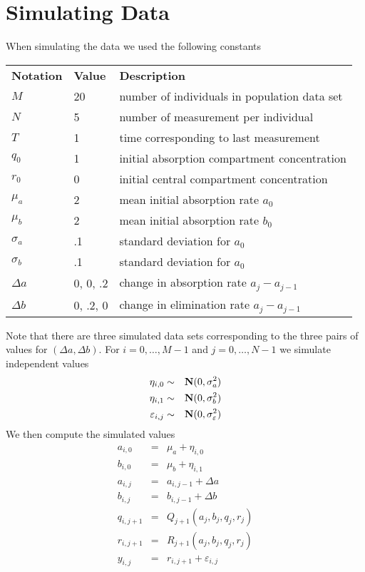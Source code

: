 \documentclass{article}
\newcommand{\B}[1]{{\bf #1}}
\begin{document}
\section{Simulating Data}
When simulating the data we used the following constants

\bigskip
\begin{tabular}{lll}
{\bf Notation}    & {\bf Value} & {\bf Description} \\
\( M \)           &  20     & number of individuals in population data set \\
\( N \)           &  5      & number of measurement per individual \\
\( T \)           &  1      & time corresponding to last measurement \\
\( q_0 \)         &  1      & initial absorption compartment concentration \\
\( r_0 \)         &  0      & initial central compartment concentration  \\
\( \mu_a \)       &  2      & mean initial absorption rate \( a_0 \) \\
\( \mu_b \)       &  2      & mean initial absorption rate \( b_0 \) \\
\( \sigma_a \)    &  .1     & standard deviation for \( a_0 \) \\
\( \sigma_b \)    &  .1     & standard deviation for \( a_0 \) \\
\( \Delta a \)    & 0, 0, .2  & change in absorption rate \( a_j - a_{j-1} \) \\
\( \Delta b \)    & 0, .2, 0  & change in elimination rate \( a_j - a_{j-1} \) 
\end{tabular}

\bigskip
\noindent
Note that there are three simulated data sets corresponding to the 
three pairs of values for \( ( \Delta a , \Delta b ) \).
For \( i = 0 , \ldots , M-1 \)
and \( j = 0 , \ldots , N-1 \)
we simulate independent values 
\begin{eqnarray*}
\eta_{i,0} & \sim & \B{N} (0, \sigma_a^2 ) \\
\eta_{i,1} & \sim & \B{N} (0, \sigma_b^2 ) \\
\varepsilon_{i,j} & \sim & \B{N} (0, \sigma_\varepsilon^2 ) 
\end{eqnarray*}
We then compute the simulated values
\begin{eqnarray*}
a_{i,0} & = & \mu_a + \eta_{i,0}        \\
b_{i,0} & = & \mu_b + \eta_{i,1}        \\
a_{i,j} & = & a_{i, j-1} + \Delta a     \\
b_{i,j} & = & b_{i, j-1} + \Delta b     \\
q_{i, j+1} & = & Q_{j+1} ( a_j , b_j , q_j , r_j ) 
\\
r_{i, j+1} & = & R_{j+1} ( a_j , b_j , q_j , r_j ) 
\\
y_{i,j} & = & r_{i, j+1} + \varepsilon_{i,j}
\end{eqnarray*}
\end{document}
